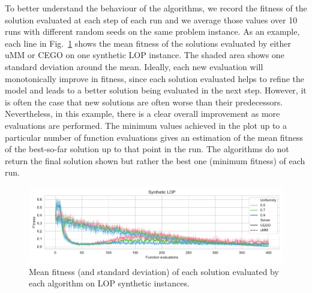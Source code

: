 \documentclass[runningheads]{llncs}
\begin{document}
To better understand the behaviour of the algorithms, we record the fitness of
the solution evaluated at each step of each run and we average those values
over 10 runs with different random seeds on the same problem instance.  As an example, each line in Fig.~\ref{fig:lop_synth} 
shows the mean fitness of the solutions evaluated by either uMM or CEGO on one synthetic LOP
instance. The shaded area shows one standard deviation around the
mean. Ideally, each new evaluation will monotonically improve in fitness, since each solution evaluated helps to refine the model and leads to a
better solution being evaluated in the next step.  However, it is often the case that  
new solutions
are often worse than their predecessors. Nevertheless, in this example, there
is a clear overall improvement as more evaluations are performed. The minimum
values achieved in the plot up to a particular number of function evaluations
gives an estimation of the mean fitness of the best-so-far solution up to that
point in the run. The algorithms do not return the final solution shown but
rather the best one (minimum fitness) of each run.


\begin{figure}[tb]
  \centering%
  \includegraphics[width=\textwidth]{img/synthetic_LOP_combined}
  \caption{Mean fitness  (and standard deviation)  of each solution evaluated by each algorithm on LOP synthetic instances.\label{fig:lop_synth}}
\end{figure}
\end{document}
